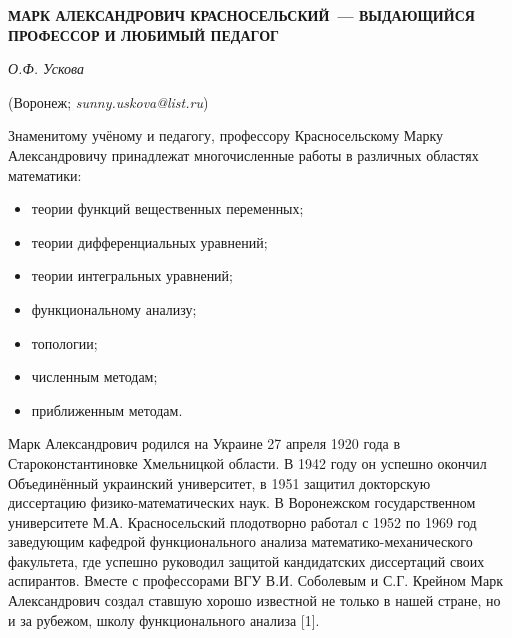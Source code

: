 \begin{center}
    {\bf МАРК АЛЕКСАНДРОВИЧ КРАСНОСЕЛЬСКИЙ~--- ВЫДАЮЩИЙСЯ ПРОФЕССОР И ЛЮБИМЫЙ ПЕДАГОГ}

    {\it О.Ф. Ускова}

    (Воронеж; {\it sunny.uskova@list.ru})
\end{center}


Знаменитому учёному и педагогу, профессору Красносельскому Марку Александровичу принадлежат многочисленные работы в различных
областях математики:
\begin{itemize}
\item теории функций вещественных переменных;
\item теории дифференциальных уравнений;
\item теории интегральных уравнений;
\item функциональному анализу;
\item топологии;
\item численным методам;
\item приближенным методам.
\end{itemize}

Марк Александрович родился на Украине 27 апреля 1920 года в Староконстантиновке Хмельницкой области. В 1942 году он успешно окончил
Объединённый украинский университет, в 1951 защитил докторскую диссертацию физико-математических наук. В Воронежском государственном
\\университете М.А. Красносельский плодотворно работал с 1952 по 1969 год заведующим кафедрой функционального анализа
математико-механического факультета, где успешно руководил защитой кандидатских диссертаций своих аспирантов. Вместе с профессорами
ВГУ В.И. Соболевым и С.Г. Крейном Марк Александрович создал ставшую хорошо известной не только в нашей стране, но и за рубежом,
школу функционального анализа [1].

